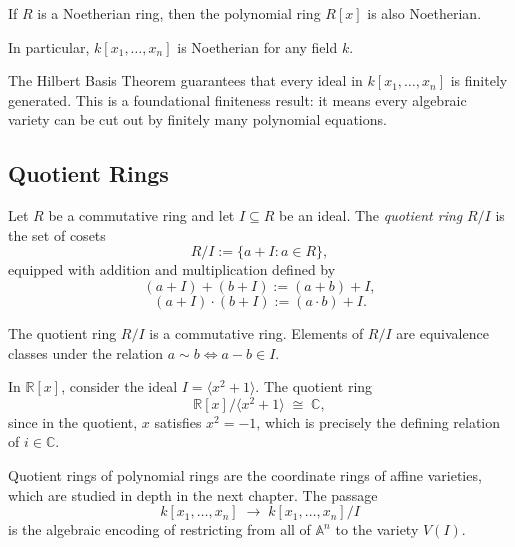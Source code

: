 \begin{theorem}
If $R$ is a Noetherian ring, then the polynomial ring $R[x]$
is also Noetherian.

In particular, $k[x_1, \dots, x_n]$ is Noetherian for any field $k$.
\end{theorem}

\begin{remark}
The Hilbert Basis Theorem guarantees that every ideal in
$k[x_1, \dots, x_n]$ is finitely generated.
This is a foundational finiteness result:
it means every algebraic variety can be cut out by
finitely many polynomial equations.
\end{remark}

\subsection*{Quotient Rings}

\begin{definition}
Let $R$ be a commutative ring and let $I \subseteq R$ be an ideal.
The \emph{quotient ring} $R/I$ is the set of cosets
\[
R/I := \{ a + I : a \in R \},
\]
equipped with addition and multiplication defined by
\[
(a + I) + (b + I) := (a + b) + I,
\]
\[
(a + I) \cdot (b + I) := (a \cdot b) + I.
\]
\end{definition}

\begin{remark}
The quotient ring $R/I$ is a commutative ring.
Elements of $R/I$ are equivalence classes under the relation
$a \sim b \iff a - b \in I$.
\end{remark}

\begin{example}
In $\mathbb{R}[x]$, consider the ideal $I = \langle x^2 + 1 \rangle$.
The quotient ring
\[
\mathbb{R}[x] / \langle x^2 + 1 \rangle \;\cong\; \mathbb{C},
\]
since in the quotient, $x$ satisfies $x^2 = -1$,
which is precisely the defining relation of $i \in \mathbb{C}$.
\end{example}

\begin{remark}
Quotient rings of polynomial rings are the coordinate rings
of affine varieties, which are studied in depth in the next chapter.
The passage
\[
k[x_1,\dots,x_n] \;\longrightarrow\; k[x_1,\dots,x_n]/I
\]
is the algebraic encoding of restricting from all of $\mathbb{A}^n$
to the variety $V(I)$.
\end{remark}